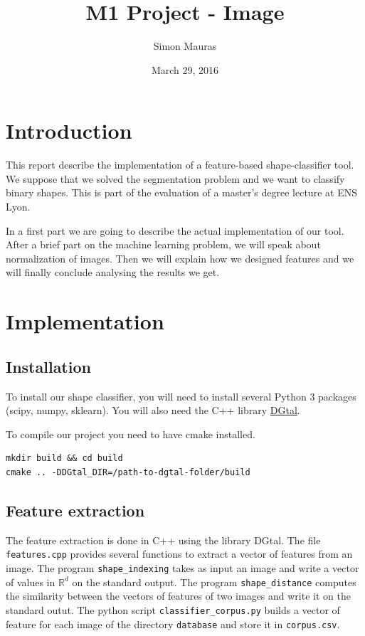 \documentclass[a4paper, 11pt]{article}
\title{M1 Project - Image}
\author{Simon Mauras}
\date{March 29,  2016}
\begin{document}
\maketitle

\tableofcontents

\newpage
\section{Introduction}

This report describe the implementation of a feature-based shape-classifier tool. We suppose that we solved the segmentation problem and we want to classify binary shapes. This is part of the evaluation of a master's degree lecture at ENS Lyon.

In a first part we are going to describe the actual implementation of our tool. After a brief part on the machine learning problem, we will speak about normalization of images. Then we will explain how we designed features and we will finally conclude analysing the results we get.

\section{Implementation}

\subsection{Installation}
To install our shape classifier, you will need to install several Python 3 packages (scipy, numpy, sklearn). You will also need the C++ library \href{http://dgtal.org}{DGtal}.

\medskip\noindent To compile our project you need to have cmake installed.
\begin{verbatim}
mkdir build && cd build
cmake .. -DDGtal_DIR=/path-to-dgtal-folder/build
\end{verbatim}

\subsection{Feature extraction}

The feature extraction is done in C++ using the library DGtal. The file \verb|features.cpp| provides several functions to extract a vector of features from an image. 
The program \verb|shape_indexing| takes as input an image and write a vector of values in $\mathbb R^d$ on the standard output.
The program \verb|shape_distance| computes the similarity between the vectors of features of two images and write it on the standard outut.
The python script \verb|classifier_corpus.py| builds a vector of feature for each image of the directory \verb|database| and store it in \verb|corpus.csv|.
\end{document}
